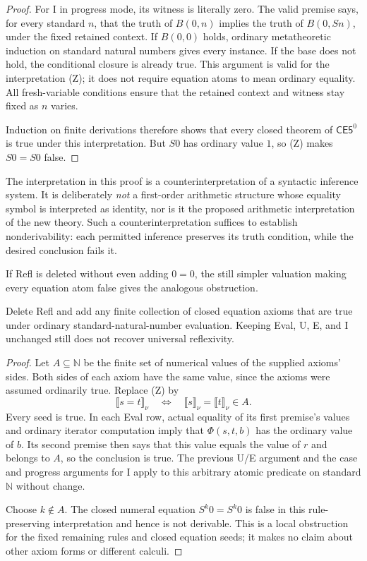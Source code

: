 \begin{proof}
For I in progress mode, its witness is literally zero. The valid
premise says, for every standard $n$, that the truth of $B(0,n)$
implies the truth of $B(0,Sn)$, under the fixed retained context.
If $B(0,0)$ holds, ordinary metatheoretic induction on standard natural
numbers gives every instance. If the base does not hold, the
conditional closure is already true. This argument is valid for
the interpretation (Z); it does not require equation atoms to mean
ordinary equality. All fresh-variable conditions ensure that the
retained context and witness stay fixed as $n$ varies.

Induction on finite derivations therefore shows that every closed
theorem of $\mathsf{CE5}^{0}$ is true under this interpretation.
But $S0$ has ordinary value $1$, so (Z) makes $S0=S0$ false.
\end{proof}

The interpretation in this proof is a counterinterpretation of a
syntactic inference system. It is deliberately \emph{not} a
first-order arithmetic structure whose equality symbol is interpreted
as identity, nor is it the proposed arithmetic interpretation of the
new theory. Such a counterinterpretation suffices to establish
nonderivability: each permitted inference preserves its truth
condition, while the desired conclusion fails it.

If Refl is deleted without even adding $0=0$, the still simpler
valuation making every equation atom false gives the analogous
obstruction.

\begin{corollary}
Delete Refl and add any finite collection of closed equation axioms
that are true under ordinary standard-natural-number evaluation.
Keeping Eval, U, E, and I unchanged still does not recover universal
reflexivity.
\end{corollary}
\begin{proof}
Let $A\subseteq\mathbb N$ be the finite set of numerical values of
the supplied axioms' sides. Both sides of each axiom have the same
value, since the axioms were assumed ordinarily true. Replace (Z) by
\[
 \llbracket s=t\rrbracket_\nu
 \quad\Longleftrightarrow\quad
 \llbracket s\rrbracket_\nu
   =\llbracket t\rrbracket_\nu\in A.
\]
Every seed is true. In each Eval row, actual equality of its first
premise's values and ordinary iterator computation imply that
$\Phi(s,t,b)$ has the ordinary value of $b$. Its second premise
then says that this value equals the value of $r$ and belongs to $A$,
so the conclusion is true. The previous U/E argument and the case
and progress arguments for I apply to this arbitrary atomic predicate
on standard $\mathbb N$ without change.

Choose $k\notin A$. The closed numeral equation
$S^k0=S^k0$ is false in this rule-preserving interpretation and hence
is not derivable. This is a local obstruction for the fixed remaining
rules and closed equation seeds; it makes no claim about other axiom
forms or different calculi.
\end{proof}

